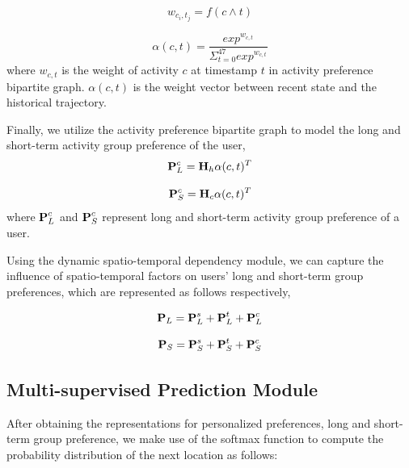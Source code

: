 \documentclass[10pt,journal,compsoc]{IEEEtran}
\begin{document}
\begin{equation}
    w_{c_i,t_j} = f(c\wedge{t})
\end{equation}

\begin{equation}
    \alpha{(c,t)} = \frac{exp^{w_{c,t}}}{\Sigma^{47}_{t=0}exp^{w_{c,t}}}
\end{equation}
where $w_{c,t}$ is the weight of activity $c$ at timestamp $t$ in activity preference bipartite graph. $\alpha({c,t})$ is the weight vector between recent state and the historical trajectory.

Finally, we utilize the activity preference bipartite graph to model the long and short-term activity group preference of the user,
\begin{equation}
    \bm{{\rm P}}^{c}_{L} = \bm{{\rm H}}_{h}\alpha(c,t)^{T}
\end{equation}

\begin{equation}
    \bm{{\rm P}}^{c}_{S} = \bm{{\rm H}}_{c}\alpha(c,t)^{T}
\end{equation}
where $\bm{{\rm P}}^{c}_{L}$ and $\bm{{\rm P}}^{c}_{S}$ represent long and short-term activity group preference of a user.

Using the dynamic spatio-temporal dependency module, we can capture the influence of spatio-temporal factors on users' long and short-term group preferences, which are represented  as follows respectively,

\begin{equation}
    \bm{{\rm P}}_{L} = \bm{{\rm P}}^{s}_{L} + \bm{{\rm P}}^{t}_{L} + \bm{{\rm P}}^{c}_{L}
\end{equation}

\begin{equation}
    \bm{{\rm P}}_{S} = \bm{{\rm P}}^{s}_{S} + \bm{{\rm P}}^{t}_{S} + \bm{{\rm P}}^{c}_{S}
\end{equation}

\subsection{\textbf{Multi-supervised Prediction Module}}

After obtaining the representations for personalized preferences, long and short-term group preference, we make use of the softmax function to compute the probability distribution  of the next location as follows:
\end{document}
